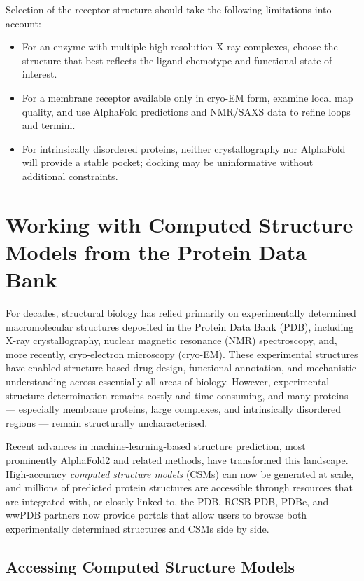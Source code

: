 \documentclass[12pt]{article}
\begin{document}
Selection of the receptor structure should take the following limitations into account:
\begin{itemize}
  \item For an enzyme with multiple high-resolution X-ray complexes, choose the structure that best reflects the ligand chemotype and functional state of interest.
  \item For a membrane receptor available only in cryo-EM form, examine local map quality, and use AlphaFold predictions and NMR/SAXS data to refine loops and termini.
  \item For intrinsically disordered proteins, neither crystallography nor AlphaFold will provide a stable pocket; docking may be uninformative without additional constraints.
\end{itemize}


\section{Working with Computed Structure Models from the Protein Data Bank}
For decades, structural biology has relied primarily on experimentally determined macromolecular structures deposited in the Protein Data Bank (PDB), including X-ray crystallography, nuclear magnetic resonance (NMR) spectroscopy, and, more recently, cryo-electron microscopy (cryo-EM).\cite{CH4_Berman2000_PDB,CH4_wwpdb2019protein} These experimental structures have enabled structure-based drug design, functional annotation, and mechanistic understanding across essentially all areas of biology. However, experimental structure determination remains costly and time-consuming, and many proteins — especially membrane proteins, large complexes, and intrinsically disordered regions — remain structurally uncharacterised.

Recent advances in machine-learning-based structure prediction, most prominently AlphaFold2\cite{CH4_Jumper2021_AlphaFold,CH4_Varadi2022_AlphaFoldDB} and related methods, have transformed this landscape. High-accuracy \emph{computed structure models} (CSMs) can now be generated at scale, and millions of predicted protein structures are accessible through resources that are integrated with, or closely linked to, the PDB. RCSB PDB, PDBe, and wwPDB partners now provide portals that allow users to browse both experimentally determined structures and CSMs side by side.\cite{CH4_wwpdb2019protein,CH4_Burley2022}


\subsection{Accessing Computed Structure Models}
\end{document}
